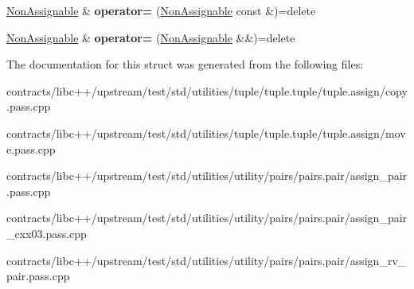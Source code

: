 \begin{DoxyCompactItemize}
\item 
\mbox{\label{struct_non_assignable_aa1161016e3701d22b378b91ede9a65f8}} 
\mbox{\hyperlink{struct_non_assignable}{Non\+Assignable}} \& {\bfseries operator=} (\mbox{\hyperlink{struct_non_assignable}{Non\+Assignable}} const \&)=delete
\item 
\mbox{\label{struct_non_assignable_a41c6d6b75481da536d58f1e2b8b44207}} 
\mbox{\hyperlink{struct_non_assignable}{Non\+Assignable}} \& {\bfseries operator=} (\mbox{\hyperlink{struct_non_assignable}{Non\+Assignable}} \&\&)=delete
\end{DoxyCompactItemize}


The documentation for this struct was generated from the following files\+:\begin{DoxyCompactItemize}
\item 
contracts/libc++/upstream/test/std/utilities/tuple/tuple.\+tuple/tuple.\+assign/copy.\+pass.\+cpp\item 
contracts/libc++/upstream/test/std/utilities/tuple/tuple.\+tuple/tuple.\+assign/move.\+pass.\+cpp\item 
contracts/libc++/upstream/test/std/utilities/utility/pairs/pairs.\+pair/assign\+\_\+pair.\+pass.\+cpp\item 
contracts/libc++/upstream/test/std/utilities/utility/pairs/pairs.\+pair/assign\+\_\+pair\+\_\+cxx03.\+pass.\+cpp\item 
contracts/libc++/upstream/test/std/utilities/utility/pairs/pairs.\+pair/assign\+\_\+rv\+\_\+pair.\+pass.\+cpp\end{DoxyCompactItemize}
